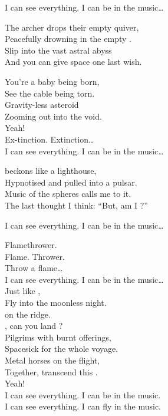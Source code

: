 I can see everything. I can be in the music… \\


The archer drops their empty quiver, \\
Peacefully drowning in the empty . \\
Slip into the vast astral abyss \\
And you can give space one last wish. \\


You're a baby being born, \\
See the cable being torn. \\
Gravity-less asteroid \\
Zooming out into the void. \\
Yeah! \\

Ex-tinction. Extinction… \\

I can see everything. I can be in the music… \\


 beckons like a lighthouse, \\
Hypnotised and pulled into a pulsar. \\
Music of the spheres calls me to it. \\
The last thought I think: ``But, am I ?'' \\


I can see everything. I can be in the music… \\


Flamethrower. \\
Flame. Thrower. \\
Throw a flame… \\

I can see everything. I can be in the music… \\

Just like , \\
Fly into the moonless night. \\
 on the ridge. \\
, can you land ? \\
Pilgrims with burnt offerings, \\
Spacesick for the whole voyage. \\
Metal horses on the flight, \\
Together, transcend this . \\
Yeah! \\

I can see everything. I can be in the music. \\
I can see everything. I can fly in the music. \\
